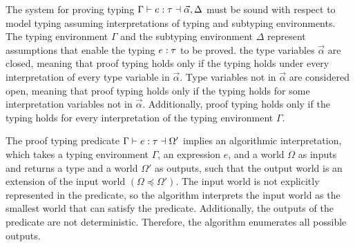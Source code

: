 \documentclass[acmsmall]{acmart}
\theoremstyle{definition}
\begin{document}
The system for proving typing $\Gamma \vdash e : \tau \dashv \vec{\alpha}, \Delta$ 
must be sound with respect to model typing assuming 
interpretations of typing and subtyping environments.
The typing environment $\Gamma$ and the subtyping environment $\Delta$
represent assumptions that enable the typing $e : \tau$ to be proved. 
the type variables $\vec{\alpha}$ are closed, meaning that proof typing
holds only if the typing holds under every interpretation of every type variable in $\vec{\alpha}$.
Type variables not in $\vec{\alpha}$ are considered open, meaning that proof typing
holds only if the typing holds for some interpretation variables not in $\vec{\alpha}$.
Additionally, proof typing holds only if the typing holds for every interpretation of
the typing environment $\Gamma$.

The proof typing predicate $\Gamma \vdash e : \tau \dashv \Omega'$
implies an algorithmic interpretation, 
which takes a typing environment $\Gamma$, an expression $e$,
and a world $\Omega$ as inputs and returns a type and a world $\Omega'$ as outputs,
such that the output world is an extension of the input world $(\Omega \preceq \Omega')$.
The input world is not explicitly represented in the predicate, so the algorithm
interprets the input world as the smallest world that can satisfy the predicate. 
Additionally, the outputs of the predicate are not deterministic. Therefore, the algorithm
enumerates all possible outputs.
\end{document}
